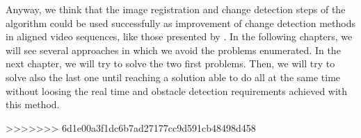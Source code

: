 Anyway, we think that the image registration and change detection steps of the algorithm could be used successfully as improvement of change detection methods in aligned video sequences, like those presented by \cite{diego2011video, evangelidis2011slice, evangelidis2011efficient}. In the following chapters, we will see several approaches in which we avoid the problems enumerated. In the next chapter, we will try to solve the two first problems. Then, we will try to solve also the last one until reaching a solution able to do all at the same time without loosing the real time and obstacle detection requirements achieved with this method.
























>>>>>>> 6d1e00a3f1dc6b7ad27177cc9d591cb48498d458
